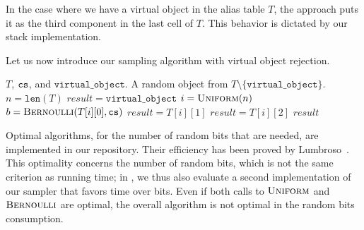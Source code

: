 
In the case where we have a virtual object in the alias table $T$,
the approach puts it as the third component in the last cell of $T$.
This behavior is dictated by our stack implementation.



Let us now introduce our sampling algorithm with virtual object rejection.
\begin{algorithm}[htb]
\caption{Random sampling with virtual object rejection} 
\label{algo:tableXY}
	\begin{algorithmic}[1]
        \scriptsize
        \renewcommand{\algorithmicrequire}{\textbf{Input:}}
        \renewcommand{\algorithmicensure}{\textbf{Output:}}
        \Require $T$, $\texttt{cs}$, and $\texttt{virtual\_object}$.
        \Ensure A random object from $T \setminus \{\texttt{virtual\_object}\}$.
            \State $n = \texttt{len}(T)$
            \State $result = \texttt{virtual\_object}$
                \State $i = \textsc{Uniform}(n)$
                \State $b = \textsc{Bernoulli}(T[i][0], \texttt{cs})$
                    \State $result = T[i][1]$
                \Else
                    \State $result = T[i][2]$
                \EndIf
            \EndWhile
            \State \Return $result$
        \EndFunction
    \end{algorithmic}
\end{algorithm}

Optimal algorithms, for the number of random bits that are needed, are implemented in our repository.
Their efficiency has been proved by Lumbroso~\cite{Lumbroso13}.
This optimality concerns the number of random bits, which is not the same criterion as running time;
in , we thus also evaluate a second implementation of our sampler that favors time over bits.
Even if both calls to $\textsc{Uniform}$ and $\textsc{Bernoulli}$ are optimal, 
the overall algorithm is not optimal in the random bits consumption.

